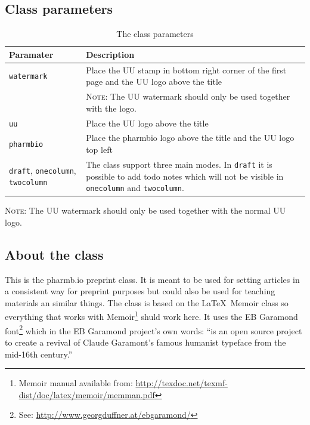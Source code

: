 \documentclass[pharmbio, watermark]{pbpreprint}
\begin{document}
\subsection{Class parameters}
\begin{table}[H]
\caption{The class parameters}
\centering
\begin{tabular}{p{}p{}}
    \toprule
    Paramater & Description \\
    \midrule
    \texttt{watermark} & Place the UU stamp in bottom right corner of the first
                         page and the UU logo above the title \\ 
                       & \textsc{Note}: The UU watermark should only be used
                         together with the logo.\\[10pt]
    \texttt{uu}        & Place the UU logo above the title \\[10pt]
    \texttt{pharmbio}  & Place the \textsf{pharmbio} logo above the title and the UU logo top left \\[10pt]
    \texttt{draft}, \texttt{onecolumn}, \texttt{twocolumn} & 
    The class support three main modes. In \texttt{draft} it is possible to add
    todo notes which will not be visible in \texttt{onecolumn} and
    \texttt{twocolumn}. \\
    \bottomrule
\end{tabular}
    \begin{flushleft}
        {\footnotesize \textsc{Note}: The UU watermark should only be used
                                      together with the normal UU logo.}
    \end{flushleft}
\end{table}

\subsection{About the class}
This is the pharm\textcolor{uured}{b.io} preprint class. It is meant to be used
for setting articles in a consistent way for preprint purposes but could also
be used for teaching materials an similar things. The class is based on the
\LaTeX\ Memoir class so everything that works with Memoir\footnote{Memoir
manual available from:
\url{http://texdoc.net/texmf-dist/doc/latex/memoir/memman.pdf}} shuld work
here. It uses the EB Garamond font\footnote{See:
\url{http://www.georgduffner.at/ebgaramond/}} which in the EB Garamond
project's own words: ``is an open source project to create a revival of Claude
Garamont’s famous humanist typeface from the mid-16th century.''
\end{document}
